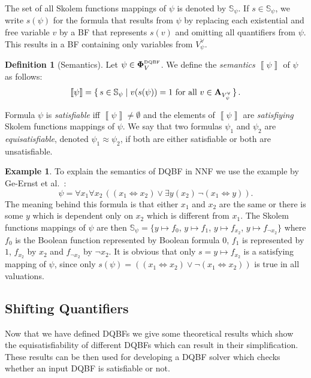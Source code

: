 \documentclass[
  digital, %
  color,
  twoside, %
  table,   %
  nolof,     %
  nolot,     %
]{fithesis3}
\let\setbuilder\set
\newcommand{\simpleset}[1]{\{{#1}\}}
\renewcommand{\set}[1]{\normalexpandarg\IfSubStr{#1}{|}{\setbuilder{#1}}{\simpleset{#1}}}
\theoremstyle{definition}
\newtheorem{definition}{Definition}
\newtheorem{example}{Example}
\theoremstyle{remark}
\newcommand{\seman}[1]{\left\llbracket {#1} \right\rrbracket}
\newcommand{\DQBF}[1]{\mathbf{\Phi}_{#1}^{\normalfont{\text{\tiny DQBF}}}}
\newcommand{\valtns}[1]{\mathbf{A}_{#1}}
\newcommand{\uvars}[1]{V_{#1}^{\forall}}
\newcommand{\Scands}[1]{\mathbb{S}_{#1}}
\newcommand{\lequal}{\Leftrightarrow}
\newcommand{\itholds}{\,}
\begin{document}
The set of all Skolem functions mappings of $\psi$ is denoted by $\Scands{\psi}$. If $s \in \Scands{\psi}$, we write $s(\psi)$ for the formula that results from $\psi$ by replacing each existential and free variable $v$ by a BF that represents $s(v)$ and omitting all quantifiers from $\psi$. This results in a BF containing only variables from $\uvars{\psi}$.

\begin{definition}[Semantics]
  Let $\psi \in \DQBF{V}$. We define the \emph{semantics} $\seman{\psi}$ of $\psi$ as follows:
  \[\seman{\psi} = \set{s \in \Scands{\psi} | v(s(\psi))=1 \text{ for all } v \in \valtns{\uvars{\psi}}}.\]
\end{definition}
Formula $\psi$ is \emph{satisfiable} iff $\seman{\psi} \not= \emptyset$ and the elements of $\seman{\psi}$ are \emph{satisfiying} Skolem functions mappings of $\psi$. We say that two formulas $\psi_1$ and $\psi_2$ are \emph{equisatisfiable}, denoted $\psi_1 \approx \psi_2$, if both are either satisfiable or both are unsatisfiable.
\begin{example}
\label{ex:DQBF:NNF}
To explain the semantics of DQBF in NNF we use the example by Ge-Ernst et al.~\cite{HQSquantifierLocalisation}:
\[\psi = \forall x_1 \forall x_2\itholds ((x_1 \lequal x_2) \lor \exists y (x_2)\itholds \neg(x_1 \lequal y)).\]
The meaning behind this formula is that either $x_1$ and $x_2$ are the same or there is some $y$ which is dependent only on $x_2$ which is different from $x_1$. The Skolem functions mappings of $\psi$ are then $\Scands{\psi} = \{y\mapsto f_0$, $y\mapsto f_1$, $y\mapsto f_{x_2}$, $y\mapsto f_{\neg x_2}\}$ where $f_0$ is the Boolean function represented by Boolean formula $0$, $f_1$ is represented by $1$, $f_{x_2}$ by $x_2$ and $f_{\neg x_2}$ by $\neg x_2$. It is obvious that only $s = y \mapsto f_{x_2}$ is a satisfying mapping of $\psi$, since only $s(\psi) = ((x_1 \lequal x_2) \lor \neg(x_1 \lequal x_2))$ is true in all valuations.
\end{example}

\subsection{Shifting Quantifiers}
\label{sec:quantLocalisation}
Now that we have defined DQBFs we give some theoretical results which show the equisatisfiability of different DQBFs which can result in their simplification. These results can be then used for developing a DQBF solver which checks whether an input DQBF is satisfiable or not.
\end{document}
